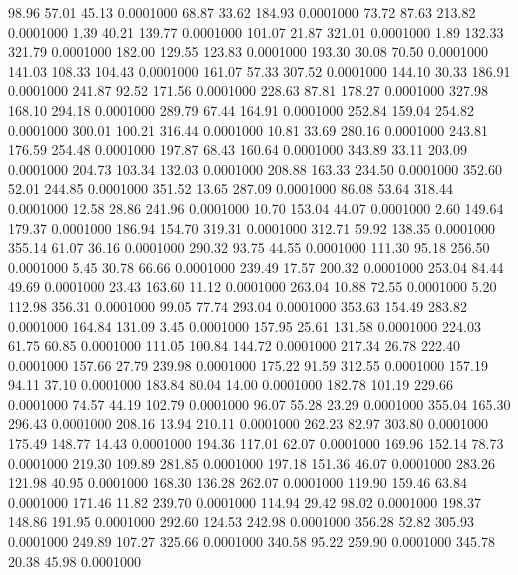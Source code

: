   98.96   57.01   45.13   0.0001000
  68.87   33.62  184.93   0.0001000
  73.72   87.63  213.82   0.0001000
   1.39   40.21  139.77   0.0001000
 101.07   21.87  321.01   0.0001000
   1.89  132.33  321.79   0.0001000
 182.00  129.55  123.83   0.0001000
 193.30   30.08   70.50   0.0001000
 141.03  108.33  104.43   0.0001000
 161.07   57.33  307.52   0.0001000
 144.10   30.33  186.91   0.0001000
 241.87   92.52  171.56   0.0001000
 228.63   87.81  178.27   0.0001000
 327.98  168.10  294.18   0.0001000
 289.79   67.44  164.91   0.0001000
 252.84  159.04  254.82   0.0001000
 300.01  100.21  316.44   0.0001000
  10.81   33.69  280.16   0.0001000
 243.81  176.59  254.48   0.0001000
 197.87   68.43  160.64   0.0001000
 343.89   33.11  203.09   0.0001000
 204.73  103.34  132.03   0.0001000
 208.88  163.33  234.50   0.0001000
 352.60   52.01  244.85   0.0001000
 351.52   13.65  287.09   0.0001000
  86.08   53.64  318.44   0.0001000
  12.58   28.86  241.96   0.0001000
  10.70  153.04   44.07   0.0001000
   2.60  149.64  179.37   0.0001000
 186.94  154.70  319.31   0.0001000
 312.71   59.92  138.35   0.0001000
 355.14   61.07   36.16   0.0001000
 290.32   93.75   44.55   0.0001000
 111.30   95.18  256.50   0.0001000
   5.45   30.78   66.66   0.0001000
 239.49   17.57  200.32   0.0001000
 253.04   84.44   49.69   0.0001000
  23.43  163.60   11.12   0.0001000
 263.04   10.88   72.55   0.0001000
   5.20  112.98  356.31   0.0001000
  99.05   77.74  293.04   0.0001000
 353.63  154.49  283.82   0.0001000
 164.84  131.09    3.45   0.0001000
 157.95   25.61  131.58   0.0001000
 224.03   61.75   60.85   0.0001000
 111.05  100.84  144.72   0.0001000
 217.34   26.78  222.40   0.0001000
 157.66   27.79  239.98   0.0001000
 175.22   91.59  312.55   0.0001000
 157.19   94.11   37.10   0.0001000
 183.84   80.04   14.00   0.0001000
 182.78  101.19  229.66   0.0001000
  74.57   44.19  102.79   0.0001000
  96.07   55.28   23.29   0.0001000
 355.04  165.30  296.43   0.0001000
 208.16   13.94  210.11   0.0001000
 262.23   82.97  303.80   0.0001000
 175.49  148.77   14.43   0.0001000
 194.36  117.01   62.07   0.0001000
 169.96  152.14   78.73   0.0001000
 219.30  109.89  281.85   0.0001000
 197.18  151.36   46.07   0.0001000
 283.26  121.98   40.95   0.0001000
 168.30  136.28  262.07   0.0001000
 119.90  159.46   63.84   0.0001000
 171.46   11.82  239.70   0.0001000
 114.94   29.42   98.02   0.0001000
 198.37  148.86  191.95   0.0001000
 292.60  124.53  242.98   0.0001000
 356.28   52.82  305.93   0.0001000
 249.89  107.27  325.66   0.0001000
 340.58   95.22  259.90   0.0001000
 345.78   20.38   45.98   0.0001000
